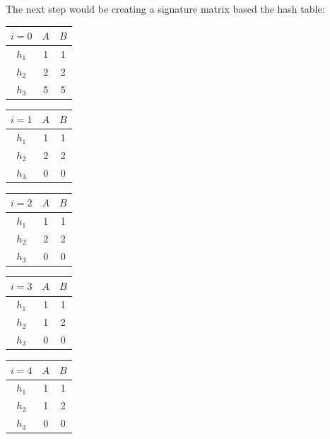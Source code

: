 \documentclass[11pt,a4paper,english]{article}
\begin{document}
\begin{enumerate}
\begin{enumerate}
            The next step would be creating a signature matrix based the hash table:
            \begin{center}
              \begin{tabular}{|c | c c |}\hline
                $i=0$ & $A$ & $B$ \\ \hline
                $h_1$ &  1  &  1  \\
                $h_2$ &  2  &  2  \\
                $h_3$ &  5  &  5  \\  \hline
              \end{tabular}
              \begin{tabular}{|c | c c |}\hline
                $i=1$ & $A$ & $B$ \\ \hline
                $h_1$ &  1  &  1  \\
                $h_2$ &  2  &  2  \\
                $h_3$ &  0  &  0  \\  \hline
              \end{tabular}
              \begin{tabular}{|c | c c |}\hline
                $i=2$ & $A$ & $B$ \\ \hline
                $h_1$ &  1  &  1  \\
                $h_2$ &  2  &  2  \\
                $h_3$ &  0  &  0  \\  \hline
              \end{tabular}
              \begin{tabular}{|c | c c |}\hline
                $i=3$ & $A$ & $B$ \\ \hline
                $h_1$ &  1  &  1  \\
                $h_2$ &  1  &  2  \\
                $h_3$ &  0  &  0  \\  \hline
              \end{tabular}
              \begin{tabular}{|c | c c |}\hline
                $i=4$ & $A$ & $B$ \\ \hline
                $h_1$ &  1  &  1  \\
                $h_2$ &  1  &  2  \\
                $h_3$ &  0  &  0  \\  \hline
              \end{tabular}
            \end{center}

\end{enumerate}
\end{enumerate}
\end{document}
